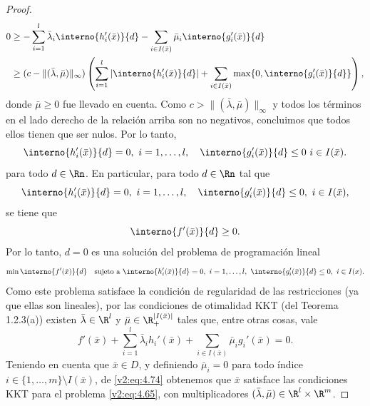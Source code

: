 \begin{proof}
\begin{align*}
        0 &\ge -\sum_{i=1}^l \bar{\lambda}_i \interno{h_i'(\bar{x})}{d} - \sum_{i \in I(\bar{x})} \bar{\mu}_i \interno{g_i'(\bar{x})}{d} \\
        &\ge (c - \|(\bar{\lambda}, \bar{\mu})\|_\infty) \left( \sum_{i=1}^l |\interno{h_i'(\bar{x})}{d}| + \sum_{i \in I(\bar{x})} \max\{0, \interno{g_i'(\bar{x})}{d}\} \right),
    \end{align*}
    donde $\bar{\mu} \ge 0$ fue llevado en cuenta. Como $c > \|(\bar{\lambda}, \bar{\mu})\|_\infty$ y todos los términos en el lado derecho de la relación arriba son no negativos, concluimos que todos ellos tienen que ser nulos. Por lo tanto,
    \[
        \interno{h_i'(\bar{x})}{d} = 0, \ i = 1, \dots, l, \quad \interno{g_i'(\bar{x})}{d} \le 0 \ i \in I(\bar{x}).
    \]
    para todo $d \in \Rn$. En particular, para todo $d \in \Rn$ tal que
    \[
        \interno{h_i'(\bar{x})}{d} = 0, \ i = 1, \dots, l, \quad \interno{g_i'(\bar{x})}{d} \le 0, \ i \in I(\bar{x}),
    \]
    se tiene que
    \[
        \interno{f'(\bar{x})}{d} \ge 0.
    \]
    Por lo tanto, $d = 0$ es una solución del problema de programación lineal
    \begin{equation}
        \min \interno{f'(\bar{x})}{d} \quad \text{sujeto a } \interno{h_i'(\bar{x})}{d} = 0, \ i = 1, \dots, l, \ \interno{g_i'(\bar{x})}{d} \le 0, \ i \in I(x).
        \label{v2:eq:4.73}
    \end{equation}
    Como este problema satisface la condición de regularidad de las restricciones (ya que ellas son lineales), por las condiciones de otimalidad KKT (del Teorema 1.2.3(a)) existen $\bar{\lambda} \in \R^l$ y $\bar{\mu} \in \R_+^{|I(\bar{x})|}$ tales que, entre otras cosas, vale
    \begin{equation}
        f'(\bar{x}) + \sum_{i=1}^l \bar{\lambda}_i h_i'(\bar{x}) + \sum_{i \in I(\bar{x})} \bar{\mu}_i g_i'(\bar{x}) = 0.
        \label{v2:eq:4.74}
    \end{equation}
    Teniendo en cuenta que $\bar{x} \in D$, y definiendo $\bar{\mu}_i = 0$ para todo índice $i \in \{1, \dots, m\} \setminus I(\bar{x})$, de \eqref{v2:eq:4.74} obtenemos que $\bar{x}$ satisface las condiciones KKT para el problema \eqref{v2:eq:4.65}, con multiplicadores $(\bar{\lambda}, \bar{\mu}) \in \R^l \times \R^m$.
    

\end{proof}
